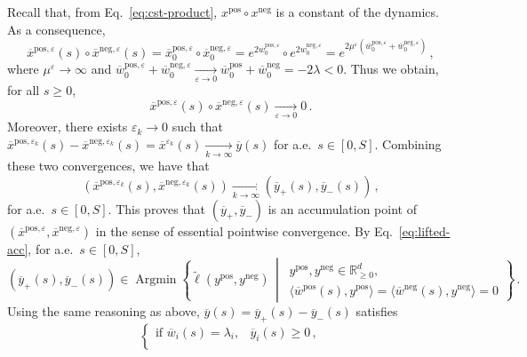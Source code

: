 \documentclass[11pt,english,reqno]{article}
\DeclareMathOperator{\Argmin}{Argmin}
\newcommand{\R}{\mathbb{R}}
\newcommand{\pos}{\text{pos}}
\renewcommand{\neg}{\text{neg}}
\renewcommand{\geq}{\geqslant}
\theoremstyle{plain}
\theoremstyle{definition}
\theoremstyle{remark}
\numberwithin{equation}{section}
\begin{document}
\begin{enumerate}[label=(\alph*)]
	Recall that, from Eq.~\eqref{eq:cst-product}, $x^\pos \circ x^\neg$ is a constant of the dynamics. As a consequence,
	\begin{equation*}
		\overline{x}^{\pos, \varepsilon}(s) \circ \overline{x}^{\neg, \varepsilon}(s) = \overline{x}^{\pos, \varepsilon}_0 \circ \overline{x}^{\neg, \varepsilon}_0 = e^{2 w_0^{\pos, \varepsilon}} \circ e^{2 w_0^{\neg, \varepsilon}} = e^{2 \mu^\varepsilon (\overline{w}_0^{\pos, \varepsilon} + \overline{w}_0^{\neg, \varepsilon})} \, ,
	\end{equation*} 
	where $\mu^\varepsilon\to \infty$ and $\overline{w}_0^{\pos, \varepsilon} + \overline{w}_0^{\neg, \varepsilon} \xrightarrow[\varepsilon \to 0]{} \overline{w}_0^\pos + \overline{w}_0^\neg = -2\lambda < 0$. Thus we obtain, for all $s \geq 0$,
	\begin{equation*}
		\overline{x}^{\pos, \varepsilon}(s) \circ \overline{x}^{\neg, \varepsilon}(s) \xrightarrow[\varepsilon \to 0]{} 0 \, . 
	\end{equation*}
	Moreover, there exists $\varepsilon_k \to 0$ such that $\overline{x}^{\pos, \varepsilon_k}(s) - \overline{x}^{\neg, \varepsilon_k}(s) = \overline{x}^{\varepsilon_k}(s) \xrightarrow[k \to \infty]{} \overline{y}(s)$ for a.e.~$s \in [0,S]$. Combining these two convergences, we have that 
	\begin{equation*}
		\left(\overline{x}^{\pos, \varepsilon_k}(s), \overline{x}^{\neg, \varepsilon_k}(s)\right) \xrightarrow[k \to \infty]{} (\overline{y}_+(s), \overline{y}_-(s)) \, , 
	\end{equation*}
	for a.e.~$s \in [0,S]$. This proves that $(\overline{y}_+,\overline{y}_-)$ is an accumulation point of $(\overline{x}^{\pos, \varepsilon},\overline{x}^{\neg, \varepsilon})$ in the sense of essential pointwise convergence. By Eq.~\eqref{eq:lifted-acc}, for a.e.~$s \in [0,S]$,
	\begin{equation*}
		(\overline{y}_+(s), \overline{y}_-(s)) \in \Argmin \left\{\widetilde{\ell}(y^\pos, y^\neg) \,\middle|\, \substack{y^\pos, y^\neg \in \R^d_{\geq 0} , \\ \langle \overline{w}^\pos(s), y^\pos \rangle = \langle \overline{w}^\neg(s), y^\neg \rangle = 0 }\right\} \, .
	\end{equation*}
	Using the same reasoning as above, $\overline{y}(s) = \overline{y}_+(s) - \overline{y}_-(s)$ satisfies
	\begin{equation*}
	\begin{cases}
		\text{if }\overline{w}_i(s) = \lambda_i, & \overline{y}_i(s) \geq 0 \, , \\

\end{cases}
\end{equation*}
\end{enumerate}
\end{document}
